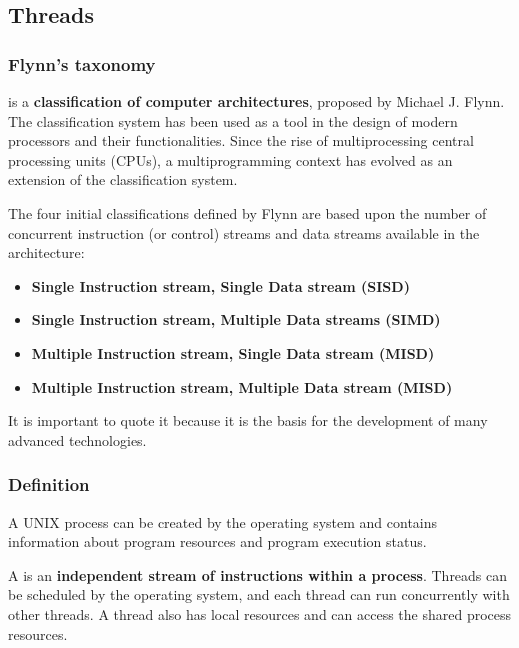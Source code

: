 \subsection{Threads}

\subsubsection{Flynn's taxonomy}

 is a \textbf{classification of computer architectures}, proposed by Michael J. Flynn. The classification system has been used as a tool in the design of modern processors and their functionalities. Since the rise of multiprocessing central processing units (CPUs), a multiprogramming context has evolved as an extension of the classification system.

\highspace
The four initial classifications defined by Flynn are based upon the number of concurrent instruction (or control) streams and data streams available in the architecture:
\begin{itemize}
    \item \textbf{Single Instruction stream, Single Data stream (SISD)}
    \item \textbf{Single Instruction stream, Multiple Data streams (SIMD)}
    \item \textbf{Multiple Instruction stream, Single Data stream (MISD)}
    \item \textbf{Multiple Instruction stream, Multiple Data stream (MISD)}
\end{itemize}
It is important to quote it because it is the basis for the development of many advanced technologies.

\longline

\subsubsection{Definition}

A UNIX process can be created by the operating system and contains information about program resources and program execution status.

\begin{definitionbox}[: Thread]
    A  is an \textbf{independent stream of instructions within a process}. Threads can be scheduled by the operating system, and each thread can run concurrently with other threads. A thread also has local resources and can access the shared process resources.
\end{definitionbox}

